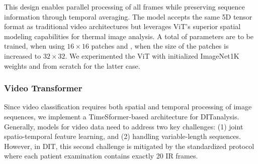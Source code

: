 \documentclass[runningheads]{llncs}
\begin{document}


This design enables parallel processing of all frames while preserving
sequence information through temporal averaging. The model accepts the
same 5D tensor format as traditional video architectures but leverages
ViT's superior spatial modeling capabilities for thermal image
analysis. A total of  parameters are to be trained,
when using $16 \times 16$ patches and , when the
size of the patches is increased to $32\times 32$. We experimented the
\ac{ViT} with initialized ImageNet1K weights and from scratch for the
latter case.

\subsubsection{Video Transformer}
\label{sec:video-transformer}

Since video classification requires both spatial and temporal
processing of image sequences, we implement a TimeSformer-based
architecture \cite{Bertasius2021} for \ac{DIT}analysis. Generally,
models for video data need to address two key challenges: (1) joint
spatio-temporal feature learning, and (2) handling variable-length
sequences. However, in \ac{DIT}, this second challenge is mitigated by
the standardized protocol where each patient examination contains
exactly 20 \ac{IR} frames.
\end{document}
